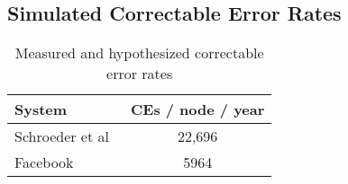\subsection{Simulated Correctable Error Rates}



\begin{table} 
        \centering 
        \begin{tabular}{ l c } 
         \toprule
               System & CEs / node / year\\
         \midrule
                Schroeder et al~\cite{Schroeder:09:dram}  & 22,696 \\
                Facebook~\cite{meza:2015:revisiting} & 5964\\ %
         \bottomrule
        \end{tabular}
        \vspace{.6em}
        \caption{ 
                Measured and hypothesized correctable error rates
        }
        \label{tab:CE_rate}
\end{table}

